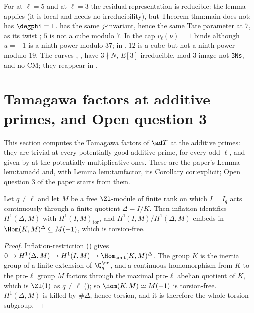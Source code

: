 \begin{example}
For  at $\ell=5$ and  at $\ell=3$ the residual representation is reducible: the lemma applies (it is local and needs no irreducibility), but Theorem
thm:main does not;  has $\degphi=1$.  has the same $j$-invariant, hence the same Tate parameter at $7$, as its twist ; $5$ is not a cube
modulo $7$. In  the cap $v_\ell(\nu)=1$ binds although $\bar u=-1$ is a ninth power modulo $37$; in , $12$ is a cube but not a ninth power modulo
$19$. The curves , ,  have $3\nmid N$, $E[3]$ irreducible, mod $3$ image not \texttt{3Ns}, and no CM; they reappear in
.
\end{example}

\section[Additive primes and Open question 3]{Tamagawa factors at additive primes, and Open question 3}\label{sec:blochkato:additive}

This section computes the Tamagawa factors of $\ad T$ at the additive primes: they are trivial at every potentially good additive prime, for every odd $\ell$, and given by
 at the potentially multiplicative ones. These are the paper's Lemma lem:tamadd and, with Lemma lem:tamfactor, its Corollary
cor:explicit; Open question 3 of the paper starts from them.

\begin{lemma}\label{lem:blochkato:finite-inertia-image}
Let $q\ne\ell$ and let $M$ be a free $\Zl$-module of finite rank on which $I=I_q$ acts continuously through a finite quotient $\Delta=I/K$. Then inflation identifies
$H^1(\Delta,M)$ with $H^1(I,M)_{\mathrm{tor}}$, and $H^1(I,M)/H^1(\Delta,M)$ embeds in $\Hom(K,M)^\Delta\subseteq M(-1)$, which is torsion-free.
\end{lemma}

\begin{proof}
Inflation-restriction () gives $0\to H^1(\Delta,M)\to H^1(I,M)\to\Hom_{\mathrm{cont}}(K,M)^\Delta$. The group $K$ is the inertia group of a finite extension of $\Q_q^{\ur}$, and
a continuous homomorphism from $K$ to the pro-$\ell$ group $M$ factors through the maximal pro-$\ell$ abelian quotient of $K$, which is $\Zl(1)$ as $q\ne\ell$ (); so
$\Hom(K,M)\simeq M(-1)$ is torsion-free. $H^1(\Delta,M)$ is killed by $\#\Delta$, hence torsion, and it is therefore the whole torsion subgroup.
\end{proof}

